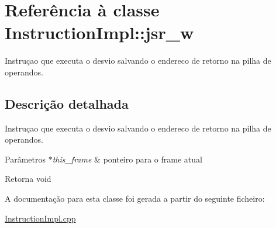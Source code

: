\hypertarget{class_instruction_impl_1_1jsr__w}{}\section{Referência à classe Instruction\+Impl\+:\+:jsr\+\_\+w}
\label{class_instruction_impl_1_1jsr__w}


Instruçao que executa o desvio salvando o endereco de retorno na pilha de operandos.  




\subsection{Descrição detalhada}
Instruçao que executa o desvio salvando o endereco de retorno na pilha de operandos. 


\begin{DoxyParams}{Parâmetros}
{\em $\ast$this\+\_\+frame} & ponteiro para o frame atual \\
\hline
\end{DoxyParams}
\begin{DoxyReturn}{Retorna}
void 
\end{DoxyReturn}


A documentação para esta classe foi gerada a partir do seguinte ficheiro\+:\begin{DoxyCompactItemize}
\item 
\hyperlink{_instruction_impl_8cpp}{Instruction\+Impl.\+cpp}\end{DoxyCompactItemize}
